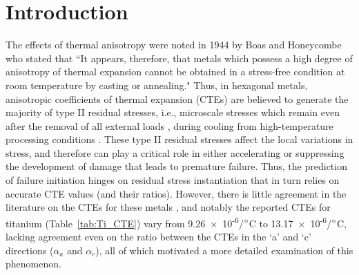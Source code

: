 \documentclass[3p]{elsarticle}
\begin{document}
	
\section{Introduction}
	The ef{}fects of thermal anisotropy were noted in 1944 by Boas and Honeycombe \cite{Boas1944} who stated that ``It appears, therefore, that metals which possess a high degree of anisotropy of thermal expansion cannot be obtained in a stress-free condition at room temperature by casting or annealing." Thus, in hexagonal metals, anisotropic coef{}ficients of thermal expansion (CTEs) are believed to generate the majority of type II residual stresses, i.e., microscale stresses which remain even after the removal of all external loads \cite{KesavanNair1995}, during cooling from high-temperature processing conditions \cite{Warwick2012,Zheng2019}.  These type II residual stresses af{}fect the local variations in stress, and therefore can play a critical role in either accelerating or suppressing the development of damage that leads to premature failure. Thus, the prediction of failure initiation hinges on residual stress instantiation that in turn relies on accurate CTE values (and their ratios). However, there is little agreement in the literature on the CTEs for these metals \cite{Pawar1968}, and notably the reported CTEs for titanium (Table~\ref{tab:Ti_CTE}) vary from 9.26~$\times$~10\textsuperscript{-6}/$\degree$C to 13.17~$\times$~10\textsuperscript{-6}/$\degree$C, lacking agreement even on the ratio between the CTEs in the `a' and `c' directions ($\alpha_a$ and $\alpha_c$), all of which motivated a more detailed examination of this phenomenon.
	
\end{document}

